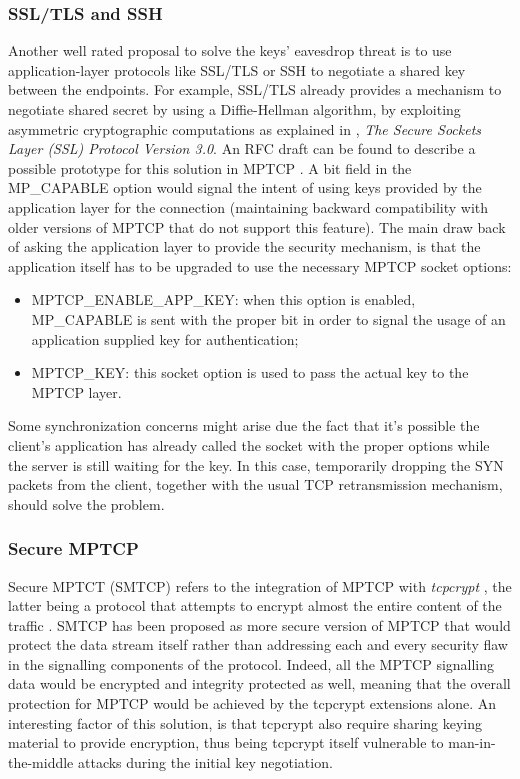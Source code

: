 \subsubsection{SSL/TLS and SSH}
Another well rated proposal to solve the keys' eavesdrop threat is to use application-layer protocols like SSL/TLS or SSH to negotiate a shared key between the endpoints. For example, SSL/TLS already provides a mechanism to negotiate shared secret by using a Diffie-Hellman algorithm, by exploiting asymmetric cryptographic computations as explained in , \textit{The Secure Sockets Layer (SSL) Protocol Version 3.0}. An RFC draft can be found to describe a possible prototype for this solution in MPTCP \cite{paasch-mptcp-ssl-00}. A bit field in the MP\_CAPABLE option would signal the intent of using keys provided by the application layer for the connection (maintaining backward compatibility with older versions of MPTCP that do not support this feature).
The main draw back of asking the application layer to provide the security mechanism, is that the application itself has to be upgraded to use the necessary MPTCP socket options:

\begin{itemize}
  \item MPTCP\_ENABLE\_APP\_KEY: when this option is enabled, MP\_CAPABLE is sent with the proper bit in order to signal the usage of an application supplied key for authentication;
  \item MPTCP\_KEY: this socket option is used to pass the actual key to the MPTCP layer.
\end{itemize}

Some synchronization concerns might arise due the fact that it's possible the client's application has already called the socket with the proper options while the server is still waiting for the key. In this case, temporarily dropping the SYN packets from the client, together with the usual TCP retransmission mechanism, should solve the problem.

\subsubsection{Secure MPTCP}
Secure MPTCT (SMTCP) refers to the integration of MPTCP with \textit{tcpcrypt} \cite{draft-bagnulo-mptcp-secure}, the latter being a protocol that attempts to encrypt almost the entire content of the traffic \cite{ietf-tcpinc-tcpcrypt-00}. SMTCP has been proposed as more secure version of MPTCP that would protect the data stream itself rather than addressing each and every security flaw in the signalling components of the protocol. Indeed, all the MPTCP signalling data would be encrypted and integrity protected as well, meaning that the overall protection for MPTCP would be achieved by the {tcpcrypt} extensions alone. An interesting factor of this solution, is that tcpcrypt also require sharing keying material to provide encryption, thus being tcpcrypt itself vulnerable to man-in-the-middle attacks during the initial key negotiation.

